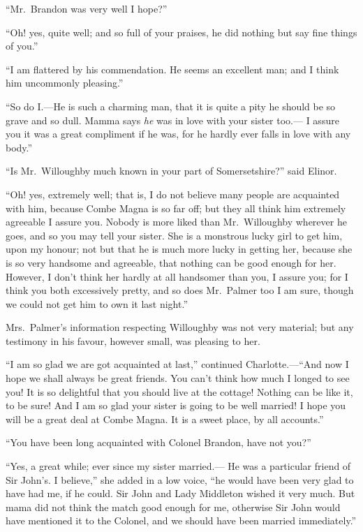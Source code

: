 ``Mr.\ Brandon was very well I hope?''

``Oh! yes, quite well; and so full of your praises,
he did nothing but say fine things of you.''

``I am flattered by his commendation.  He seems
an excellent man; and I think him uncommonly pleasing.''

``So do I.---He is such a charming man, that it
is quite a pity he should be so grave and so dull.
Mamma says \emph{he} was in love with your sister too.---%
I assure you it was a great compliment if he was, for he
hardly ever falls in love with any body.''

``Is Mr.\ Willoughby much known in your part
of Somersetshire?'' said Elinor.

``Oh! yes, extremely well; that is, I do not believe
many people are acquainted with him, because Combe Magna
is so far off; but they all think him extremely agreeable
I assure you.  Nobody is more liked than Mr.\ Willoughby
wherever he goes, and so you may tell your sister.
She is a monstrous lucky girl to get him, upon my honour;
not but that he is much more lucky in getting her,
because she is so very handsome and agreeable, that nothing
can be good enough for her.  However, I don't think
her hardly at all handsomer than you, I assure you;
for I think you both excessively pretty, and so does
Mr.\ Palmer too I am sure, though we could not get him
to own it last night.''

Mrs.\ Palmer's information respecting Willoughby
was not very material; but any testimony in his favour,
however small, was pleasing to her.

``I am so glad we are got acquainted at last,''
continued Charlotte.---``And now I hope we shall always be
great friends.  You can't think how much I longed to see you!
It is so delightful that you should live at the cottage!
Nothing can be like it, to be sure!  And I am so glad
your sister is going to be well married!  I hope you will
be a great deal at Combe Magna.  It is a sweet place,
by all accounts.''

``You have been long acquainted with Colonel Brandon,
have not you?''

``Yes, a great while; ever since my sister married.---%
He was a particular friend of Sir John's. I believe,''
she added in a low voice, ``he would have been very
glad to have had me, if he could.  Sir John and Lady
Middleton wished it very much.  But mama did not think
the match good enough for me, otherwise Sir John would
have mentioned it to the Colonel, and we should have been
married immediately.''

